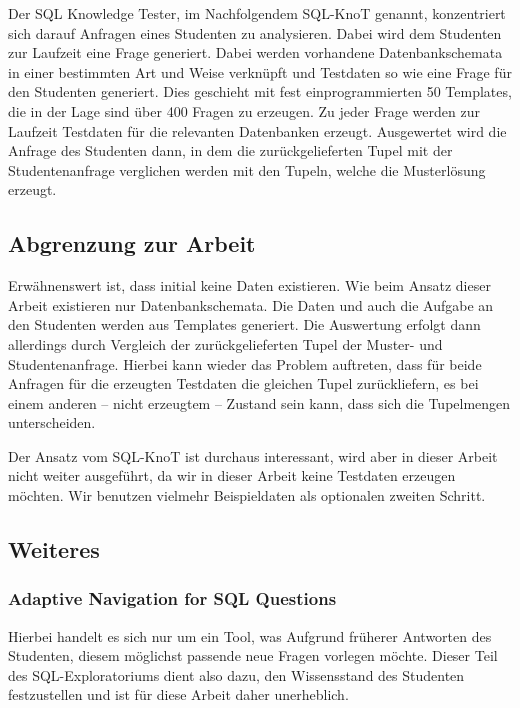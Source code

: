 Der SQL Knowledge Tester, im Nachfolgendem SQL-KnoT genannt, konzentriert sich darauf Anfragen eines Studenten zu analysieren. Dabei wird dem Studenten zur Laufzeit eine Frage generiert. Dabei werden vorhandene Datenbankschemata in einer bestimmten Art und Weise verknüpft und Testdaten so wie eine Frage für den Studenten generiert. Dies geschieht mit fest einprogrammierten 50 Templates, die in der Lage sind über 400 Fragen zu erzeugen. Zu jeder Frage werden zur Laufzeit Testdaten für die relevanten Datenbanken erzeugt. Ausgewertet wird die Anfrage des Studenten dann, in dem die zurückgelieferten Tupel mit der Studentenanfrage verglichen werden mit den Tupeln, welche die Musterlösung erzeugt. 

\subsection*{Abgrenzung zur Arbeit}

Erwähnenswert ist, dass initial keine Daten existieren. Wie beim Ansatz dieser Arbeit existieren nur Datenbankschemata. Die Daten und auch die Aufgabe an den Studenten werden aus Templates generiert. Die Auswertung erfolgt dann allerdings durch Vergleich der zurückgelieferten Tupel der Muster- und Studentenanfrage. Hierbei kann wieder das Problem auftreten, dass für beide Anfragen für die erzeugten Testdaten die gleichen Tupel zurückliefern, es bei einem anderen -- nicht erzeugtem -- Zustand sein kann, dass sich die Tupelmengen unterscheiden.

Der Ansatz vom SQL-KnoT ist durchaus interessant, wird aber in dieser Arbeit nicht weiter ausgeführt, da wir in dieser Arbeit keine Testdaten erzeugen möchten. Wir benutzen vielmehr Beispieldaten als optionalen zweiten Schritt.

\subsection{Weiteres}

\subsubsection{Adaptive Navigation for SQL Questions}

Hierbei handelt es sich nur um ein Tool, was Aufgrund früherer Antworten des Studenten, diesem möglichst passende neue Fragen vorlegen möchte. Dieser Teil des SQL-Exploratoriums dient also dazu, den Wissensstand des Studenten festzustellen und ist für diese Arbeit daher unerheblich.

